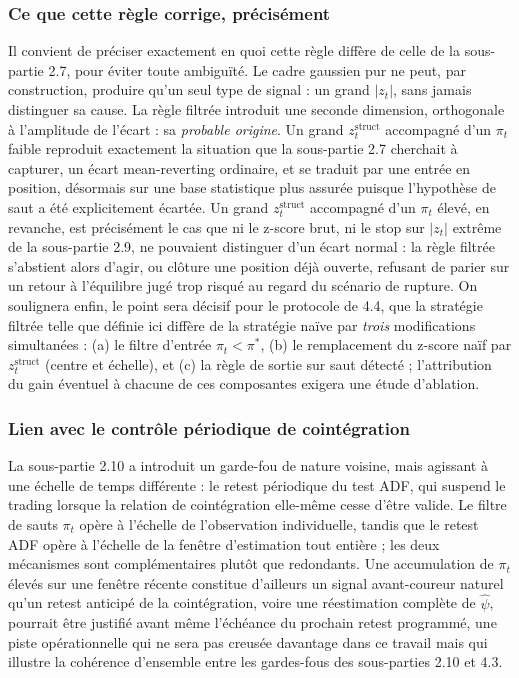 \documentclass{article}
\begin{document}
\subsubsection*{Ce que cette règle corrige, précisément}
Il convient de préciser exactement en quoi cette règle diffère de celle de la sous-partie 2.7, pour éviter toute ambiguïté. Le cadre gaussien pur ne peut, par construction, produire qu'un seul type de signal : un grand $|z_t|$, sans jamais distinguer sa cause. La règle filtrée introduit une seconde dimension, orthogonale à l'amplitude de l'écart : sa \emph{probable origine}. Un grand $z_t^{\text{struct}}$ accompagné d'un $\pi_t$ faible reproduit exactement la situation que la sous-partie 2.7 cherchait à capturer, un écart mean-reverting ordinaire, et se traduit par une entrée en position, désormais sur une base statistique plus assurée puisque l'hypothèse de saut a été explicitement écartée. Un grand $z_t^{\text{struct}}$ accompagné d'un $\pi_t$ élevé, en revanche, est précisément le cas que ni le z-score brut, ni le stop sur $|z_t|$ extrême de la sous-partie 2.9, ne pouvaient distinguer d'un écart normal : la règle filtrée s'abstient alors d'agir, ou clôture une position déjà ouverte, refusant de parier sur un retour à l'équilibre jugé trop risqué au regard du scénario de rupture. On soulignera enfin, le point sera décisif pour le protocole de 4.4, que la stratégie filtrée telle que définie ici diffère de la stratégie naïve par \emph{trois} modifications simultanées : (a) le filtre d'entrée $\pi_t<\pi^\ast$, (b) le remplacement du z-score naïf par $z_t^{\text{struct}}$ (centre et échelle), et (c) la règle de sortie sur saut détecté ; l'attribution du gain éventuel à chacune de ces composantes exigera une étude d'ablation.
\subsubsection*{Lien avec le contrôle périodique de cointégration}
La sous-partie 2.10 a introduit un garde-fou de nature voisine, mais agissant à une échelle de temps différente : le retest périodique du test ADF, qui suspend le trading lorsque la relation de cointégration elle-même cesse d'être valide. Le filtre de sauts $\pi_t$ opère à l'échelle de l'observation individuelle, tandis que le retest ADF opère à l'échelle de la fenêtre d'estimation tout entière ; les deux mécanismes sont complémentaires plutôt que redondants. Une accumulation de $\pi_t$ élevés sur une fenêtre récente constitue d'ailleurs un signal avant-coureur naturel qu'un retest anticipé de la cointégration, voire une réestimation complète de $\hat{\psi}$, pourrait être justifié avant même l'échéance du prochain retest programmé, une piste opérationnelle qui ne sera pas creusée davantage dans ce travail mais qui illustre la cohérence d'ensemble entre les gardes-fous des sous-parties 2.10 et 4.3.
\end{document}

